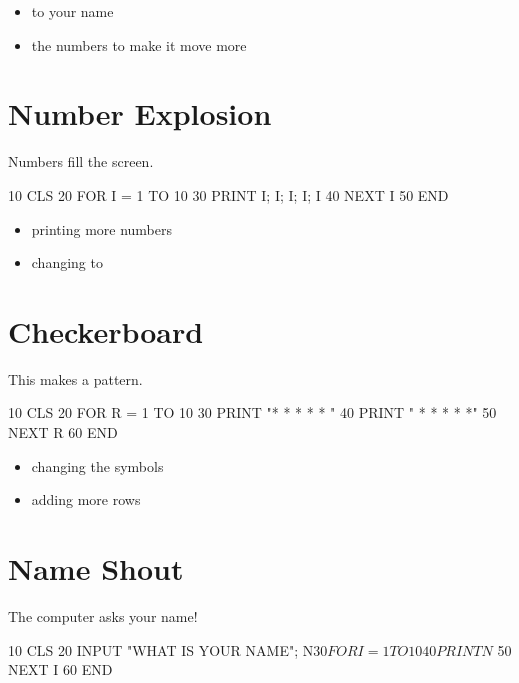 \documentclass[12pt,oneside,paper=5.5in:8.5in,DIV=11,chapterprefix=false,headings=big]{scrbook}
\begin{document}
\begin{trythis}
\begin{itemize}
\item {} to your name
\item the numbers to make it move more
\end{itemize}
\end{trythis}

\section{Number Explosion}

Numbers fill the screen.

\begin{code}
10 CLS
20 FOR I = 1 TO 10
30 PRINT I; I; I; I; I
40 NEXT I
50 END
\end{code}

\begin{trythis}
\begin{itemize}
\item printing more numbers
\item changing  to 
\end{itemize}
\end{trythis}

\section{Checkerboard}

This makes a pattern.

\begin{code}
10 CLS
20 FOR R = 1 TO 10
30 PRINT "* * * * * "
40 PRINT " * * * * *"
50 NEXT R
60 END
\end{code}

\begin{trythis}
\begin{itemize}
\item changing the symbols
\item adding more rows
\end{itemize}
\end{trythis}

\section{Name Shout}

The computer asks your name!

\begin{code}
10 CLS
20 INPUT "WHAT IS YOUR NAME"; N$
30 FOR I = 1 TO 10
40 PRINT N$
50 NEXT I
60 END
\end{code}
\end{document}
